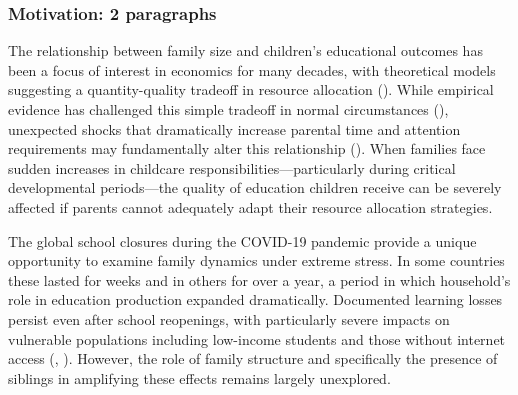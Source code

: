 





\subsubsection{Motivation: 2 paragraphs}

The relationship between family size and children's educational outcomes has been a focus of interest in economics for many decades, with theoretical models suggesting a quantity-quality tradeoff in resource allocation (\cite{becker_child_1976}). While empirical evidence has challenged this simple tradeoff in normal circumstances (\cite{black_more_2005}), unexpected shocks that dramatically increase parental time and attention requirements may fundamentally alter this relationship (\cite{black_recent_2010}). When families face sudden increases in childcare responsibilities—particularly during critical developmental periods—the quality of education children receive can be severely affected if parents cannot adequately adapt their resource allocation strategies.


The global school closures during the COVID-19 pandemic provide a unique opportunity to examine family dynamics under extreme stress. In some countries these lasted for weeks and in others for over a year, a period in which household's role in education production expanded dramatically. Documented learning losses persist even after school reopenings, with particularly severe impacts on vulnerable populations including low-income students and those without internet access (\cite{haelermans_inequality_2022}, \cite{jakubowski_global_2023}). However, the role of family structure and specifically the presence of siblings in amplifying these effects remains largely unexplored.\textbf{}

